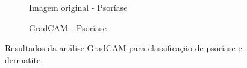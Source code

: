 \begin{figure}[h]
  \vspace{0.5cm}
  
  \begin{subfigure}[b]{0.45\textwidth}
    \centering
    \caption{Imagem original - Psoríase}
    \label{fig:gradcam-original-dermatite}
  \end{subfigure}
  \hspace{0.1cm}
  \begin{subfigure}[b]{0.45\textwidth}
    \centering
    \caption{GradCAM - Psoríase}
    \label{fig:gradcam-heatmap-dermatite}
  \end{subfigure}
  
  \caption{Resultados da análise GradCAM para classificação de psoríase e dermatite.}
  \label{fig:gradcam}
\end{figure}


